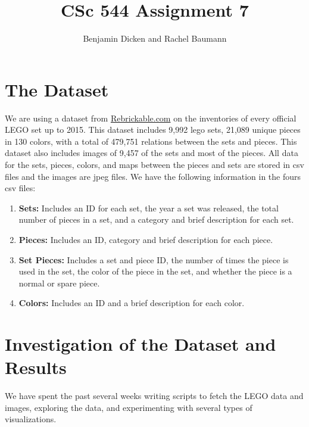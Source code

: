 \documentclass[a4paper, 11pt]{article}
\title{CSc 544 Assignment 7}
\author{Benjamin Dicken and Rachel Baumann}
\begin{document}
\maketitle
\noindent

\section*{The Dataset}

%
%

We are using a dataset from \href{http://rebrickable.com/}{Rebrickable.com} on the inventories of every official LEGO set up to 2015. This dataset includes 9,992 lego sets, 21,089 unique pieces in 130 colors, with a total of 479,751 relations between the sets and pieces. This dataset also includes images of 9,457 of the sets and most of the pieces. All data for the sets, pieces, colors, and maps between the pieces and sets are stored in csv files and the images are jpeg files. We have the following information in the fours csv files:

\begin{enumerate}

\item {\bf Sets:} Includes an ID for each set, the year a set was released, the total number of pieces in a set, and a category and brief description for each set.

\item {\bf Pieces:} Includes an ID, category and brief description for each piece.

\item {\bf Set Pieces:} Includes a set and piece ID, the number of times the piece is used in the set, the color of the piece in the set, and whether the piece is a normal or spare piece.


\item {\bf Colors:} Includes an ID and a brief description for each color.

\end{enumerate}



\section*{Investigation of the Dataset and Results}

We have spent the past several weeks writing scripts to fetch the LEGO data and images, exploring the data, and experimenting with several types of visualizations.
\end{document}
